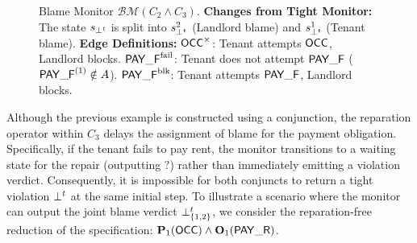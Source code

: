 \begin{example}
\begin{figure}[h!]
  \caption{Blame Monitor $\mathcal{BM}(C_2 \wedge C_3)$.
  \textbf{Changes from Tight Monitor:}
  The state $s_{\bott}$ is split into $s_{\bott}^2$ (Landlord blame) and $s_{\bott}^1$ (Tenant blame).
  \textbf{Edge Definitions:}
  $\OCC^\times$: Tenant attempts $\OCC$, Landlord blocks.
 $\PAYF^{\text{fail}}$: Tenant does not attempt $\PAYF$ ($\PAYF^{(1)} \notin A$).
  $\PAYF^{\text{blk}}$: Tenant attempts $\PAYF$, Landlord blocks.
  }
  \label{fig:blame-monitor}
  \end{figure}
  \end{example}

  Although the previous example is constructed using a conjunction, the reparation operator within $C_3$ delays the assignment of blame for the payment obligation.
Specifically, if the tenant fails to pay rent, the monitor transitions to a waiting state for the repair (outputting $\mathsf{?}$) rather than immediately emitting a violation verdict.
Consequently, it is impossible for both conjuncts to return a tight violation $\bott$ at the same initial step.
To illustrate a scenario where the monitor can output the joint blame verdict $\bottp{\{1,2\}}$, we consider the reparation-free reduction of the specification: $\perm[1]{\OCC} \wedge \obl[1]{\PAY}$.

